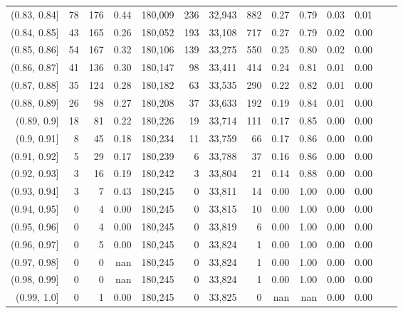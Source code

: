 \begin{tabular}{rrrrrrrrrrrrrr}
(0.83, 0.84]   &     78 &  176 &    0.44 &  180,009 &      236 &  32,943 &     882 &  0.27 &  0.79 &  0.03 &      0.01 \\
(0.84, 0.85]   &     43 &  165 &    0.26 &  180,052 &      193 &  33,108 &     717 &  0.27 &  0.79 &  0.02 &      0.00 \\
(0.85, 0.86]   &     54 &  167 &    0.32 &  180,106 &      139 &  33,275 &     550 &  0.25 &  0.80 &  0.02 &      0.00 \\
(0.86, 0.87]   &     41 &  136 &    0.30 &  180,147 &       98 &  33,411 &     414 &  0.24 &  0.81 &  0.01 &      0.00 \\
(0.87, 0.88]   &     35 &  124 &    0.28 &  180,182 &       63 &  33,535 &     290 &  0.22 &  0.82 &  0.01 &      0.00 \\
(0.88, 0.89]   &     26 &   98 &    0.27 &  180,208 &       37 &  33,633 &     192 &  0.19 &  0.84 &  0.01 &      0.00 \\
(0.89, 0.9]    &     18 &   81 &    0.22 &  180,226 &       19 &  33,714 &     111 &  0.17 &  0.85 &  0.00 &      0.00 \\
(0.9, 0.91]    &      8 &   45 &    0.18 &  180,234 &       11 &  33,759 &      66 &  0.17 &  0.86 &  0.00 &      0.00 \\
(0.91, 0.92]   &      5 &   29 &    0.17 &  180,239 &        6 &  33,788 &      37 &  0.16 &  0.86 &  0.00 &      0.00 \\
(0.92, 0.93]   &      3 &   16 &    0.19 &  180,242 &        3 &  33,804 &      21 &  0.14 &  0.88 &  0.00 &      0.00 \\
(0.93, 0.94]   &      3 &    7 &    0.43 &  180,245 &        0 &  33,811 &      14 &  0.00 &  1.00 &  0.00 &      0.00 \\
(0.94, 0.95]   &      0 &    4 &    0.00 &  180,245 &        0 &  33,815 &      10 &  0.00 &  1.00 &  0.00 &      0.00 \\
(0.95, 0.96]   &      0 &    4 &    0.00 &  180,245 &        0 &  33,819 &       6 &  0.00 &  1.00 &  0.00 &      0.00 \\
(0.96, 0.97]   &      0 &    5 &    0.00 &  180,245 &        0 &  33,824 &       1 &  0.00 &  1.00 &  0.00 &      0.00 \\
(0.97, 0.98]   &      0 &    0 &     nan &  180,245 &        0 &  33,824 &       1 &  0.00 &  1.00 &  0.00 &      0.00 \\
(0.98, 0.99]   &      0 &    0 &     nan &  180,245 &        0 &  33,824 &       1 &  0.00 &  1.00 &  0.00 &      0.00 \\
(0.99, 1.0]    &      0 &    1 &    0.00 &  180,245 &        0 &  33,825 &       0 &   nan &   nan &  0.00 &      0.00 \\
\bottomrule
\end{tabular}
